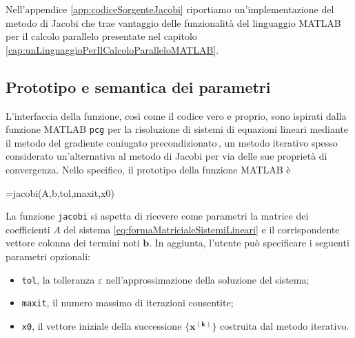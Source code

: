 Nell'appendice \ref{app:codiceSorgenteJacobi} riportiamo un'implementazione del metodo di Jacobi che trae vantaggio delle funzionalit\`a del linguaggio MATLAB per il 
calcolo parallelo presentate nel capitolo \ref{cap:unLinguaggioPerIlCalcoloParalleloMATLAB}.

\subsection{Prototipo e semantica dei parametri}
L'interfaccia della funzione, cos\`i come il codice vero e proprio, sono ispirati dalla funzione MATLAB 
\lstinline|pcg| per la risoluzione di sistemi di equazioni lineari mediante il metodo del gradiente coniugato precondizionato\,\cite{MathWorksPCG}, 
un metodo iterativo spesso considerato un'alternativa al metodo di Jacobi per via delle sue propriet\`a di convergenza.
Nello specifico, il prototipo della funzione MATLAB \`e
\begin{matlabcode}
=jacobi(A,b,tol,maxit,x0)
\end{matlabcode}
La funzione \lstinline|jacobi| si aspetta di ricevere come parametri la matrice dei coefficienti $A$ del sistema \eqref{eq:formaMatricialeSistemiLineari} e il corrispondente vettore colonna dei termini noti $\mathbf{b}$.\newline
In aggiunta, l'utente pu\`o specificare i seguenti parametri opzionali:
\begin{itemize}
    \item \lstinline|tol|, la tolleranza $\varepsilon$ nell'approssimazione della soluzione del sistema;
    \item \lstinline|maxit|, il numero massimo di iterazioni consentite;
    \item \lstinline|x0|, il vettore iniziale della successione $\mathbf{\{x^{(k)}\}}$ costruita dal metodo iterativo.
\end{itemize}

